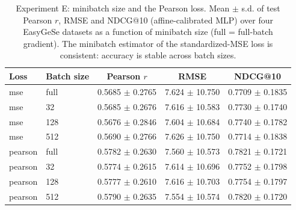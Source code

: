 \begin{table}[ht]
\caption{Experiment E: minibatch size and the Pearson loss. Mean $\pm$ s.d. of test Pearson $r$, RMSE and NDCG@10 (affine-calibrated MLP) over four EasyGeSe datasets as a function of minibatch size (full = full-batch gradient). The minibatch estimator of the standardized-MSE loss is consistent: accuracy is stable across batch sizes.}
\label{tab:S-batch}
\begin{tabular}{llccc}
\toprule
Loss & Batch size & Pearson $r$ & RMSE & NDCG@10 \\
\midrule
mse & full & 0.5685 $\pm$ 0.2765 & 7.624 $\pm$ 10.750 & 0.7709 $\pm$ 0.1835 \\
mse & 32 & 0.5685 $\pm$ 0.2676 & 7.616 $\pm$ 10.583 & 0.7730 $\pm$ 0.1740 \\
mse & 128 & 0.5676 $\pm$ 0.2846 & 7.604 $\pm$ 10.684 & 0.7740 $\pm$ 0.1782 \\
mse & 512 & 0.5690 $\pm$ 0.2766 & 7.626 $\pm$ 10.750 & 0.7714 $\pm$ 0.1838 \\
pearson & full & 0.5782 $\pm$ 0.2630 & 7.560 $\pm$ 10.573 & 0.7821 $\pm$ 0.1721 \\
pearson & 32 & 0.5774 $\pm$ 0.2615 & 7.614 $\pm$ 10.696 & 0.7752 $\pm$ 0.1798 \\
pearson & 128 & 0.5777 $\pm$ 0.2610 & 7.616 $\pm$ 10.703 & 0.7754 $\pm$ 0.1797 \\
pearson & 512 & 0.5790 $\pm$ 0.2635 & 7.554 $\pm$ 10.574 & 0.7820 $\pm$ 0.1720 \\
\bottomrule
\end{tabular}
\end{table}
